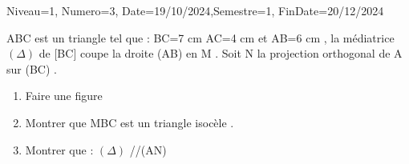 \documentclass[a4paper,12pt]{article}
\begin{document}
\begin{Maquette}[DM]{Niveau=1, Numero=3, Date=19/10/2024,Semestre=1, FinDate=20/12/2024}
\begin{exercice}
\begin{minipage}{.4\linewidth}
\begin{tikzpicture}
\end{tikzpicture}
\end{minipage}
\end{exercice}

\begin{exercice}
ABC est un triangle tel que : BC=7 cm AC=4 cm et AB=6 cm , la médiatrice $(\Delta)$  de [BC] coupe la droite (AB) en M .
\newline
Soit N la projection orthogonal de A sur (BC) .
\begin{enumerate}
\item Faire une figure 
\item Montrer que MBC est un triangle isocèle .
\item Montrer que : $(\Delta)$ //(AN)
\end{enumerate}
\end{exercice}




\end{Maquette}
\end{document}
